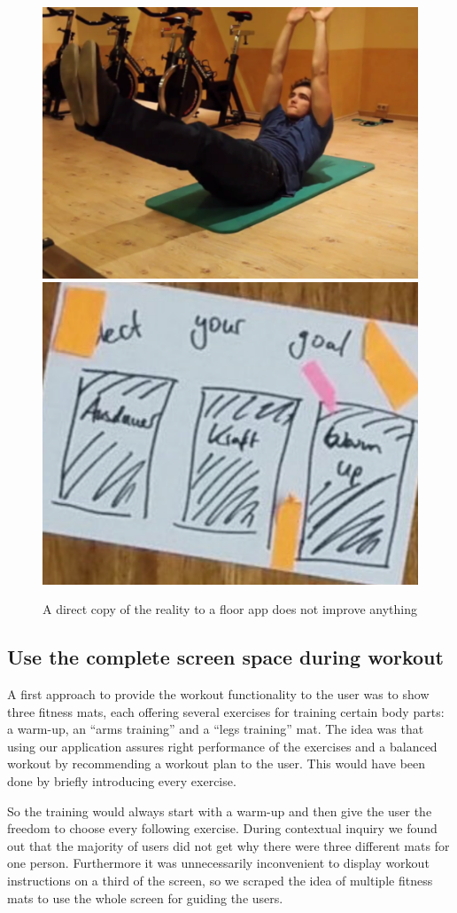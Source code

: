 \documentclass{sigchi}
\begin{document}
  \begin{figure}[htb]
    \centering
    \includegraphics[width=0.505\linewidth]{Image_18}
    \includegraphics[width=0.455\linewidth]{Image_19}
    \caption{A direct copy of the reality to a floor app does not improve anything}
    \label{fig:copy}
  \end{figure}

  \subsection{Use the complete screen space during workout} %
  \label{sub:use_the_complete_screen_space_during_workout}

    A first approach to provide the workout functionality to the user was to show three fitness mats, each offering several exercises for training certain body parts: a warm-up, an ``arms training'' and a ``legs training'' mat. The idea was that using our application assures right performance of the exercises and a balanced workout by recommending a workout plan to the user. This would have been done by briefly introducing every exercise. 

    So the training would always start with a warm-up and then give the user the freedom to choose every following exercise. During contextual inquiry we found out that the majority of users did not get why there were three different mats for one person. Furthermore it was unnecessarily inconvenient to display workout instructions on a third of the screen, so we scraped the idea of multiple fitness mats to use the whole screen for guiding the users.
\end{document}

